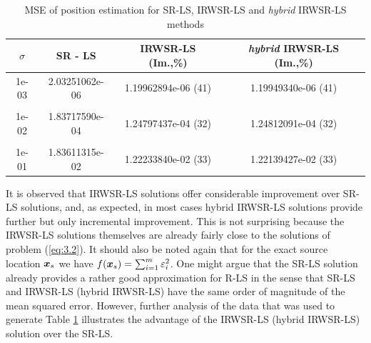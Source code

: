 
\begin{table}[h]
\centering
\caption{MSE of position estimation for SR-LS, IRWSR-LS and \textit{hybrid} IRWSR-LS methods}
\phantom{m}
\begin{tabular}{|c|c|c|c|} \hline
\centering
$\sigma$ & SR - LS & IRWSR-LS (Im.,\%) & \textit{hybrid} IRWSR-LS (Im.,\%) \\ \hline
1e-03&	2.03251062e-06&	1.19962894e-06 (41)	& 1.19949340e-06 (41)\\ &&&\\
1e-02&	1.83717590e-04&	1.24797437e-04 (32)	& 1.24812091e-04 (32)\\ &&&\\
1e-01&	1.83611315e-02&	1.22233840e-02 (33)	& 1.22139427e-02 (33)\\ %
\hline
\end{tabular}
\label{tab:1}
\end{table}



It is observed that IRWSR-LS solutions offer considerable improvement over SR-LS solutions, and, as expected, in most cases hybrid IRWSR-LS solutions provide further but only incremental improvement. This is not surprising because the IRWSR-LS solutions themselves are already fairly close to the solutions of problem (\ref{eq:3.2}). It should also be noted again that for the exact source location $\mbox{\boldmath$x$}_s$ we have $f(\mbox{\boldmath$x$}_s) = \sum_{i=1}^m \varepsilon_i^2$. One might argue that the SR-LS solution already provides a rather good approximation for R-LS in the sense that SR-LS and IRWSR-LS (hybrid IRWSR-LS) have the same order of magnitude of the mean squared error. However, further analysis of the data that was used to generate Table \ref{tab:1} illustrates the advantage of the IRWSR-LS (hybrid IRWSR-LS) solution over the SR-LS. 


